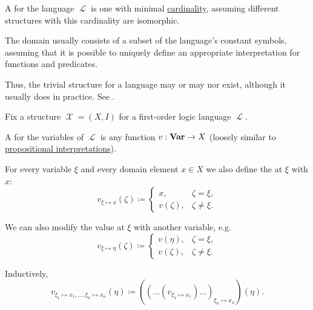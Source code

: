 \begin{definition}\label{def:trivial_structure}\mimprovised
  A  for the language \( \mscrL \) is one with minimal \hyperref[thm:cardinality_existence]{cardinality}, assuming different structures with this cardinality are isomorphic.

  The domain usually consists of a subset of the language's constant symbols, assuming that it is possible to uniquely define an appropriate interpretation for functions and predicates.

  Thus, the trivial structure for a language may or may nor exist, although it usually does in practice. See .
\end{definition}

\begin{definition}\label{def:first_order_valuation}
  Fix a structure \( \mscrX = (X, I) \) for a first-order logic language \( \mscrL \).

  \begin{thmenum}
     A  for the variables of \( \mscrL \) is any function \( v: \operatorname{\mathbf{Var}} \to X \) (loosely similar to \hyperref[def:propositional_valuation/interpretation]{propositional interpretations}).

     For every variable \( \xi \) and every domain element \( x \in X \) we also define the  at \( \xi \) with \( x \):
    \begin{equation*}
      v_{\xi \mapsto x}(\zeta) \coloneqq \begin{cases}
        x,        &\zeta = \xi, \\
        v(\zeta), &\zeta \neq \xi.
      \end{cases}
    \end{equation*}

    We can also modify the value at \( \xi \) with another variable, e.g.
    \begin{equation*}
      v_{\xi \mapsto \eta}(\zeta) \coloneqq \begin{cases}
        v(\eta),  &\zeta = \xi, \\
        v(\zeta), &\zeta \neq \xi.
      \end{cases}
    \end{equation*}

    Inductively,
    \begin{equation*}
      v_{\xi_1 \mapsto x_1, \ldots, \xi_n \mapsto x_n}(\eta) \coloneqq ((\ldots(v_{\xi_1 \mapsto x_1})\ldots)_{\xi_n \mapsto x_n})(\eta).
    \end{equation*}


\end{thmenum}
\end{definition}
